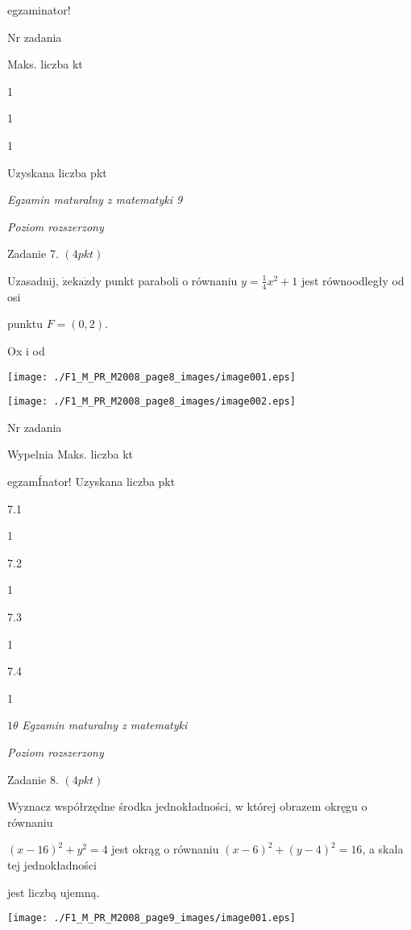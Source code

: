 \documentclass[a4paper,12pt]{article}
\begin{document}
egzaminator!

Nr zadania

Maks. liczba kt

1

1

1

Uzyskana liczba pkt





{\it Egzamin maturalny z matematyki 9}

{\it Poziom rozszerzony}

Zadanie 7. $(4pkt)$

Uzasadnij, $\dot{\mathrm{z}}\mathrm{e}\mathrm{k}\mathrm{a}\dot{\mathrm{z}}\mathrm{d}\mathrm{y}$ punkt paraboli o równaniu $y=\displaystyle \frac{1}{4}x^{2}+1$ jest równoodległy od osi

punktu $F=(0,2).$

Ox i od
\begin{center}
\texttt{[image: ./F1\_M\_PR\_M2008\_page8\_images/image001.eps]}

\texttt{[image: ./F1\_M\_PR\_M2008\_page8\_images/image002.eps]}
\end{center}
Nr zadania

Wypelnia Maks. liczba kt

egzamÍnator! Uzyskana liczba pkt

7.1

1

7.2

1

7.3

1

7.4

1





$ 1\theta$ {\it Egzamin maturalny z matematyki}

{\it Poziom rozszerzony}

Zadanie 8. $(4pkt)$

Wyznacz współrzędne środka jednokładności, w której obrazem okręgu o równaniu

$(x-16)^{2}+y^{2}=4$ jest okrąg o równaniu $(x-6)^{2}+(y-4)^{2}=16$, a skala tej jednokładności

jest liczbą ujemną.
\begin{center}
\texttt{[image: ./F1\_M\_PR\_M2008\_page9\_images/image001.eps]}
\end{center}
\end{document}
